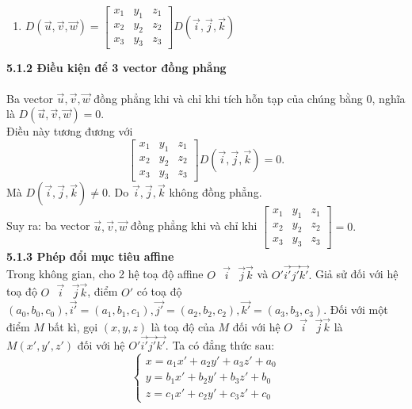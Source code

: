 \documentclass[12pt,a4]{article}
\begin{document}
\begin{titlepage}
\begin{enumerate}
\begin{enumerate}
        \item $D(\vec{u},\vec{v},\vec{w}) = \begin{bmatrix} x_1 & y_1 & z_1 \\ x_2 & y_2 & z_2\\ x_3 & y_3 & z_3\end{bmatrix}D(\vec{i},\vec{j},\vec{k})$
    \end{enumerate}
\end{enumerate}
\vspace{0.2cm}
\textbf{5.1.2 Điều kiện để 3 vector đồng phẳng}\\
\vspace{0.2cm}\\
Ba vector $\vec{u}, \vec{v}, \vec{w}$ đồng phẳng khi và chỉ khi tích hỗn tạp của chúng bằng $0$, nghĩa là $D(\vec{u},\vec{v},\vec{w}) = 0.$\\
Điều này tương đương với
\[
\begin{bmatrix}
x_1 & y_1 & z_1\\x_2 & y_2 & z_2\\x_3 & y_3 & z_3
\end{bmatrix}
D(\vec{i},\vec{j},\vec{k}) = 0.
\]
Mà $D(\vec{i},\vec{j},\vec{k}) \neq 0.$ Do $\vec{i}, \vec{j}, \vec{k}$ không đồng phẳng.\\
Suy ra: ba vector $\vec{u}, \vec{v}, \vec{w}$ đồng phẳng khi và chỉ khi $\begin{bmatrix} x_1 & y_1 & z_1\\x_2 & y_2 & z_2\\x_3 & y_3 & z_3\end{bmatrix} = 0.$\\
\vspace{0.2cm}
\textbf{5.1.3 Phép đổi mục tiêu affine}\\
\vspace{0.2cm}
Trong không gian, cho 2 hệ toạ độ affine $O\textbf{ }\vec{i}\textbf{ }\vec{j}\vec{k}$ và $O'\vec{i'}\vec{j'}\vec{k'}.$ Giả sử đối với hệ toạ độ $O\textbf{ }\vec{i}\textbf{ }\vec{j}\vec{k}$, điểm $O'$ có toạ độ $(a_0,b_0,c_0), \vec{i'} = (a_1,b_1,c_1), \vec{j'} = (a_2,b_2,c_2), \vec{k'} = (a_3,b_3,c_3).$ Đối với một điểm $M$ bất kì, gọi $(x,y,z)$ là toạ độ của $M$ đối với hệ $O\textbf{ }\vec{i}\textbf{ }\vec{j}\vec{k}$ là $M(x',y',z')$ đối với hệ $O'\vec{i'}\vec{j'}\vec{k'}$. Ta có đẳng thức sau:
\[
\begin{cases} x = a_1x' + a_2y' + a_3z' + a_0\\y = b_1x' + b_2y' + b_3z' + b_0\\z = c_1x' + c_2y' + c_3z' + c_0\end{cases}
\]
\end{titlepage}
\end{document}
